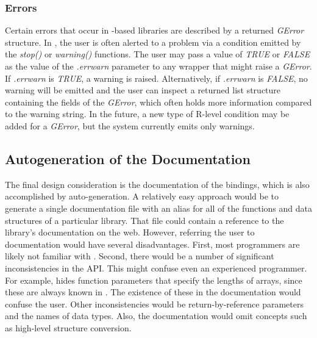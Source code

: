 \documentclass[article]{jss}
\begin{document}
\subsubsection{Errors}

Certain errors that occur in -based libraries are described
by a returned \emph{GError} structure. In , the user is
often alerted to a problem via a condition emitted by the
\emph{stop()} or \emph{warning()} functions.  The user may pass a
value of \emph{TRUE} or \emph{FALSE} as the value of the
\emph{.errwarn} parameter to any wrapper that might raise a
\emph{GError}.  If \emph{.errwarn} is \emph{TRUE}, a warning is
raised.  Alternatively, if \emph{.errwarn} is \emph{FALSE}, no warning
will be emitted and the user can inspect a returned list structure
containing the fields of the \emph{GError}, which often holds more
information compared to the warning string. In the future, a new type of R-level condition may be added for a \emph{GError}, but the system currently emits only warnings.


\subsection{Autogeneration of the Documentation}

The final design consideration is the documentation of the bindings,
which is also accomplished by auto-generation. A relatively easy
approach
would be to generate a single documentation file with an alias for all
of
the functions and data structures of a particular library. That file
could
contain a reference to the library's  documentation on the
web. 
However, referring the user to  documentation would have
several disadvantages. First, most  programmers are likely
not
familiar with . Second, there would be a
number of significant inconsistencies in the API. This might confuse
even an experienced  programmer.
For example,  hides function parameters that specify the
lengths of 
arrays, since these are always known in . The existence of
these in 
the  documentation would confuse the  user.
Other 
inconsistencies would be return-by-reference parameters and the names
of data 
types. Also, the  documentation would omit concepts such
as
high-level structure conversion.
\end{document}
